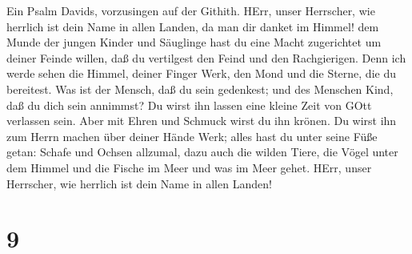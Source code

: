  Ein Psalm Davids, vorzusingen auf der Githith. 
HErr, unser Herrscher, wie herrlich ist dein Name in allen Landen, da
man dir danket im Himmel!  dem Munde der jungen Kinder und
Säuglinge hast du eine Macht zugerichtet um deiner Feinde willen, daß du
vertilgest den Feind und den Rachgierigen.  Denn ich werde
sehen die Himmel, deiner Finger Werk, den Mond und die Sterne, die du
bereitest.  Was ist der Mensch, daß du sein gedenkest; und
des Menschen Kind, daß du dich sein annimmst?  Du wirst ihn
lassen eine kleine Zeit von GOtt verlassen sein. Aber mit Ehren und
Schmuck wirst du ihn krönen.  Du wirst ihn zum Herrn machen
über deiner Hände Werk; alles hast du unter seine Füße getan:
 Schafe und Ochsen allzumal, dazu auch die wilden Tiere,
 die Vögel unter dem Himmel und die Fische im Meer und was
im Meer gehet.  HErr, unser Herrscher, wie herrlich ist
dein Name in allen Landen!

\hypertarget{section-8}{%
\section{9}\label{section-8}}

